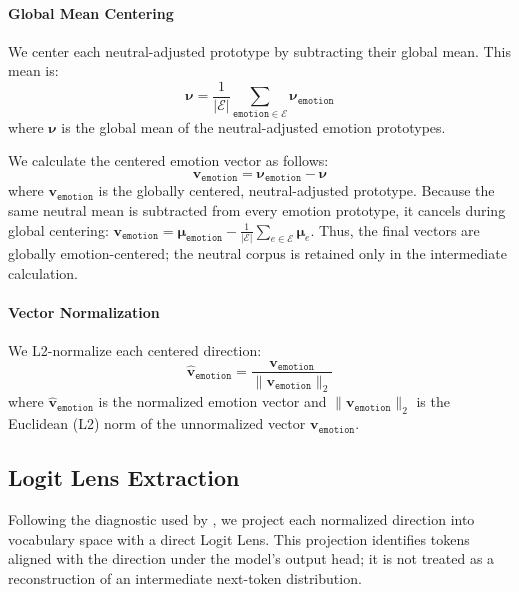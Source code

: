 \paragraph{Global Mean Centering} We center each neutral-adjusted prototype by subtracting their global mean. This mean is:
\begin{equation}
    \boldsymbol{\nu}=\frac{1}{|\mathcal{E}|}\sum_{{\mathtt{emotion}}\in \mathcal{E}}^{}\boldsymbol{\nu}_{\mathtt{emotion}}
    \label{eqtn:global-mean}
\end{equation}
where $\boldsymbol{\nu}$ is the global mean of the neutral-adjusted emotion prototypes.

We calculate the centered emotion vector as follows:
\begin{equation}
    \mathbf{v}_{\mathtt{emotion}}=\boldsymbol{\nu}_{\mathtt{emotion}}-\boldsymbol{\nu}
    \label{eqtn:emotion-vector}
\end{equation}
where $\mathbf{v}_{\mathtt{emotion}}$ is the globally centered, neutral-adjusted prototype. Because the same neutral mean is subtracted from 
every emotion prototype, it cancels during global centering: $\mathbf{v}_{\mathtt{emotion}}=\boldsymbol{\mu}_{\mathtt{emotion}}-\frac{1}{|\mathcal{E}|}\sum_{e\in\mathcal{E}}\boldsymbol{\mu}_e$. 
Thus, the final vectors are globally emotion-centered; the neutral corpus is retained only in the intermediate calculation.

\paragraph{Vector Normalization} We L2-normalize each centered direction:
\begin{equation}
    \mathbf{\hat{v}}_{\mathtt{emotion}}=\frac{\mathbf{v}_{\mathtt{emotion}}}{\lVert \mathbf{v}_{\mathtt{emotion}} \rVert_2}
    \label{eqtn:normalized-emotion}
\end{equation}
where $\mathbf{\hat{v}}_{\mathtt{emotion}}$ is the normalized emotion vector and $\lVert \mathbf{v}_{\mathtt{emotion}} \rVert_2$ is the Euclidean
(L2) norm of the unnormalized vector $\mathbf{v}_{\mathtt{emotion}}$.

\subsection{Logit Lens Extraction}

Following the diagnostic used by \cite{hsieh_replicating_2026}, we project each normalized direction into vocabulary space with a direct 
Logit Lens. This projection identifies tokens aligned with the direction under the model's output head; it is not treated as a reconstruction 
of an intermediate next-token distribution.

